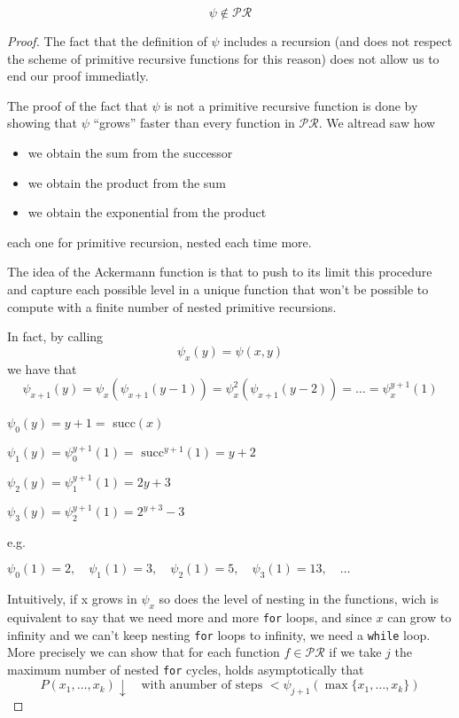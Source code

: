 \begin{theorem}
  \[ \psi \notin \mathcal{PR} \]
  \begin{proof}
    The fact that the definition of $\psi$ includes a recursion (and
    does not respect the scheme of primitive recursive functions for
    this reason) does not allow us to end our proof immediatly.

    The proof of the fact that $\psi$ is not a primitive recursive
    function is done by showing that $\psi$ ``grows'' faster than
    every function in $\mathcal{PR}$. We altread saw how
    \begin{itemize}
    \item we obtain the sum from the successor
    \item we obtain the product from the sum
    \item we obtain the exponential from the product
    \end{itemize}
    each one for primitive recursion, nested each time more.

    The idea of the Ackermann function is that to push to its limit
    this procedure and capture each possible level in a unique
    function that won't be possible to compute with a finite number of
    nested primitive recursions.

    In fact, by calling \[\psi_x(y) = \psi(x,y)\] we have
    that
    \[
      \psi_{x+1}(y) = \psi_x(\psi_{x+1}(y-1)) =
      \psi^2_{x}(\psi_{x+1}(y-2)) = \dots = \psi_x^{y+1}(1)
    \]

    \(\psi_0(y) = y+1 = \) succ$(x)$

    \(\psi_1(y) = \psi_0^{y+1}(1) = \text{ succ}^{y+1}(1) = y+2\)
    
    \(\psi_2(y) = \psi_1^{y+1}(1) = 2y+3\)

    \(\psi_3(y) = \psi_2^{y+1}(1) = 2^{y+3}-3\)

    e.g.

    \(\psi_0(1) = 2, \quad \psi_1(1) = 3, \quad \psi_2(1) = 5, \quad
    \psi_3(1) = 13, \quad \dots\)

    Intuitively, if x grows in $\psi_x$ so does the level of nesting
    in the functions, wich is equivalent to say that we need more and
    more \texttt{for} loops, and since $x$ can grow to infinity and we
    can't keep nesting \texttt{for} loops to infinity, we need a
    \texttt{while} loop. More precisely we can show that for each
    function $f \in \mathcal{PR}$ if we take $j$ the maximum number of
    nested \texttt{for} cycles, holds asymptotically that
    \[
      P(x_1, \dots, x_k)\downarrow \quad \text{with anumber of steps }
      < \psi_{j+1}(\max\{x_1, \dots, x_k\})
    \]


\end{proof}
\end{theorem}
